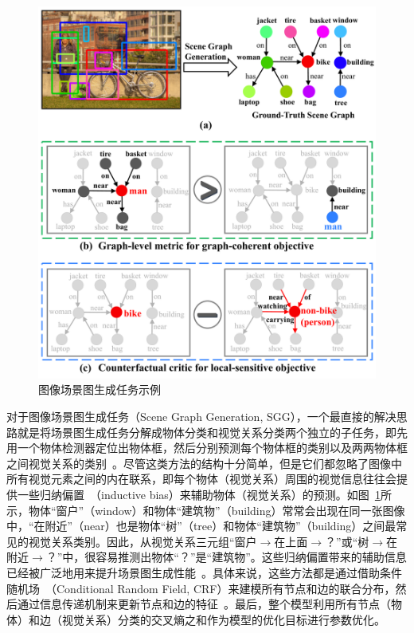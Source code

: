 \begin{figure}[t]
    \centering
    \includegraphics[width=0.95\linewidth]{chapter4/res/sgg.pdf}
    \caption{图像场景图生成任务示例}
    \label{ch4:fig:sgg}
\end{figure}

对于图像场景图生成任务（Scene Graph Generation, SGG），一个最直接的解决思路就是将场景图生成任务分解成物体分类和视觉关系分类两个独立的子任务，即先用一个物体检测器定位出物体框，然后分别预测每个物体框的类别以及两两物体框之间视觉关系的类别~\cite{lu2016visual,zhang2017visual,yang2018shuffle}。尽管这类方法的结构十分简单，但是它们都忽略了图像中所有视觉元素之间的内在联系，即每个物体（视觉关系）周围的视觉信息往往会提供一些归纳偏置~\cite{divvala2009empirical}（inductive bias）来辅助物体（视觉关系）的预测。如图~\ref{ch4:fig:sgg}所示，物体“窗户”（window）和物体“建筑物”（building）常常会出现在同一张图像中，“在附近”（near）也是物体“树”（tree）和物体“建筑物”（building）之间最常见的视觉关系类别。因此，从视觉关系三元组“窗户$\to$在上面$\to$？”或“树$\to$在附近$\to$？”中，很容易推测出物体“？”是“建筑物”。这些归纳偏置带来的辅助信息已经被广泛地用来提升场景图生成性能~\cite{xu2017scene, dai2017detecting, li2017vip, li2017scene, li2018factorizable, yin2018zoom, jae2018tensorize, zellers2018neural, tang2019learning, gu2019scene, qi2019attentive, wang2019exploring, qian2019video}。具体来说，这些方法都是通过借助条件随机场~\cite{zheng2015conditional}（Conditional Random Field, CRF）来建模所有节点和边的联合分布，然后通过信息传递机制来更新节点和边的特征~\cite{krahenbuhl2011efficient}。最后，整个模型利用所有节点（物体）和边（视觉关系）分类的交叉熵之和作为模型的优化目标进行参数优化。

